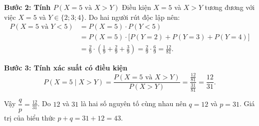 \begin{ex}
{		\textbf{Bước 2: Tính $P(X=5 \text{ và } X>Y)$}
		Điều kiện $X=5$ và $X>Y$ tương đương với việc $X=5$ và $Y \in \{2; 3; 4\}$.
		Do hai người rút độc lập nên:
		\begin{align*}
		P(X=5 \text{ và } Y < 5) &= P(X=5) \cdot P(Y < 5) \\
		&= P(X=5) \cdot \big[ P(Y=2) + P(Y=3) + P(Y=4) \big] \\
		&= \frac{2}{9} \cdot \left( \frac{1}{9} + \frac{2}{9} + \frac{3}{9} \right) = \frac{2}{9} \cdot \frac{6}{9} = \frac{12}{81}.
		\end{align*}
		
		\textbf{Bước 3: Tính xác suất có điều kiện}
		$$P(X=5 \mid X>Y) = \frac{P(X=5 \text{ và } X>Y)}{P(X>Y)} = \frac{\frac{12}{81}}{\frac{31}{81}} = \frac{12}{31}.$$
		
		Vậy $\dfrac{q}{p} = \frac{12}{31}$. Do $12$ và $31$ là hai số nguyên tố cùng nhau nên $q = 12$ và $p = 31$.
		Giá trị của biểu thức $p + q = 31 + 12 = 43$.
	}
\end{ex}
